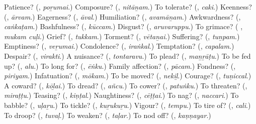 \begin{tcolorbox}[breakable,colback=teal!4,colframe=teal!35!black,title={Before you move on}]
Patience? (\textbf{}, \emph{poṟumai}.) Composure? (\textbf{}, \emph{nitāṉam}.) To tolerate? (\textbf{}, \emph{caki}.) Keenness? (\textbf{}, \emph{ārvam}.) Eagerness? (\textbf{}, \emph{āval}.) Humiliation? (\textbf{}, \emph{avamāṉam}.) Awkwardness? (\textbf{}, \emph{caṅkaṭam}.) Bashfulness? (\textbf{}, \emph{kūccam}.) Disgust? (\textbf{}, \emph{aruvaruppu}.) To grimace? (\textbf{ }, \emph{mukam cuḷi}.) Grief? (\textbf{}, \emph{tukkam}.) Torment? (\textbf{}, \emph{vētaṉai}.) Suffering? (\textbf{}, \emph{tuṉpam}.) Emptiness? (\textbf{}, \emph{veṟumai}.) Condolence? (\textbf{}, \emph{iraṅkal}.) Temptation? (\textbf{}, \emph{capalam}.) Despair? (\textbf{}, \emph{virakti}.) A nuisance? (\textbf{}, \emph{tontaravu}.) To plead? (\textbf{}, \emph{maṉṟāṭu}.) To be fed up? (\textbf{}, \emph{alu}.) To long for? (\textbf{}, \emph{ēṅku}.) Family affection? (\textbf{}, \emph{pācam}.) Fondness? (\textbf{}, \emph{piriyam}.) Infatuation? (\textbf{}, \emph{mōkam}.) To be moved? (\textbf{}, \emph{nekiḻ}.) Courage? (\textbf{}, \emph{tuṇiccal}.) A coward? (\textbf{}, \emph{kōḻai}.) To dread? (\textbf{}, \emph{añcu}.) To cower? (\textbf{}, \emph{patuṅku}.) To threaten? (\textbf{}, \emph{miraṭṭu}.) Teasing? (\textbf{}, \emph{kiṇṭal}.) Naughtiness? (\textbf{}, \emph{cēṭṭai}.) To nag? (\textbf{}, \emph{naccari}.) To babble? (\textbf{}, \emph{uḷaṟu}.) To tickle? (\textbf{}, \emph{kuṟukuṟu}.) Vigour? (\textbf{}, \emph{tempu}.) To tire of? (\textbf{}, \emph{cali}.) To droop? (\textbf{}, \emph{tuvaḷ}.) To weaken? (\textbf{}, \emph{taḷar}.) To nod off? (\textbf{}, \emph{kaṇṇayar}.)
\end{tcolorbox}
